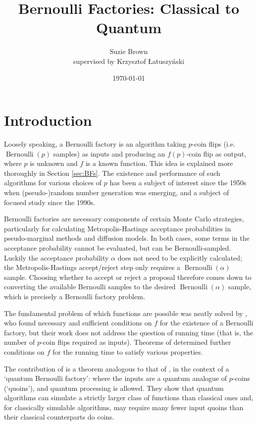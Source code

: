 \documentclass{article}
\title{Bernoulli Factories: Classical to Quantum}
\author{Suzie Brown \\ {\small supervised by Krzysztof \L atuszy\'nski}}
\date{\today}
\theoremstyle{definition}
\newcommand{\Bern}{\operatorname{Bernoulli}}
\begin{document}
\maketitle

\section{Introduction}
Loosely speaking, a Bernoulli factory is an algorithm taking $p$-coin flips (i.e.\ $\Bern(p)$ samples) as inputs and producing an $f(p)$-coin flip as output, where $p$ is unknown and $f$ is a known function. This idea is explained more thoroughly in Section \ref{sec:BFs}.
The existence and performance of such algorithms for various choices of $p$ has been a subject of interest since the 1950s when (pseudo-)random number generation was emerging, and a subject of focused study since the 1990s.

Bernoulli factories are necessary components of certain Monte Carlo strategies, particularly for calculating Metropolis-Hastings acceptance probabilities in pseudo-marginal methods and diffusion models. 
In both cases, some terms in the acceptance probability cannot be evaluated, but can be Bernoulli-sampled. Luckily the acceptance probability $\alpha$ does not need to be explicitly calculated; the Metropolis-Hastings accept/reject step only requires a $\Bern(\alpha)$ sample. Choosing whether to accept or reject a proposal therefore comes down to converting the available Bernoulli samples to the desired $\Bern(\alpha)$ sample, which is precisely a Bernoulli factory problem.

The fundamental problem of which functions are possible was neatly solved by \citet{keane1994}, who found necessary and sufficient conditions on $f$ for the existence of a Bernoulli factory, but their work does not address the question of running time (that is, the number of $p$-coin flips required as inputs).
Theorems of \citet{nacu2005} determined further conditions on $f$ for the running time to satisfy various properties.

The contribution of \citet{dale2015} is a theorem analogous to that of \citet{keane1994}, in the context of a `quantum Bernoulli factory': where the inputs are a quantum analogue of $p$-coins (`quoins'), and quantum processing is allowed.
They show that quantum algorithms can simulate a strictly larger class of functions than classical ones and, for classically simulable algorithms, may require many fewer input quoins than their classical counterparts do coins.
\end{document}
